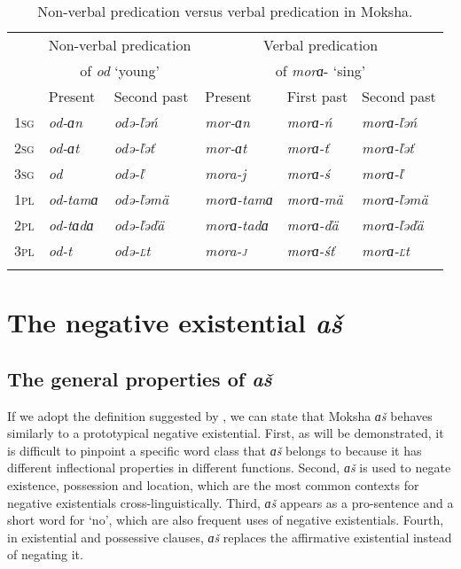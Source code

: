 \documentclass[output=paper,colorlinks,citecolor=brown,draft,draftmode]{langscibook}
\begin{document}
\begin{table}
\small
\newlength{\colnonverb}
\newlength{\colverb}
\newlength{\colfirst}
\newlength{\colsecond}
\caption{Non-verbal predication versus verbal predication in Moksha.}
\label{tab:2:4}
\begin{tabular}{ *6{l} }
\lsptoprule
         & \multicolumn{2}{c}{Non-verbal predication} & \multicolumn{3}{c}{Verbal predication}\\
         & \multicolumn{2}{c}{of \textit{od} `young'} & \multicolumn{3}{c}{of \textit{morɑ}- `sing'}\\
          \cmidrule(lr){2-3}\cmidrule(lr){4-6}
          &{Present} 	&{Second past} 	&{Present}	&{First past}	&{Second past}\\
\midrule
\textsc{{1sg}}	&\textit{od-ɑn} 	&\textit{odə-ľəń}	&\textit{mor-ɑn}	&\textit{morɑ-ń}		&\textit{morɑ-ľəń}\\
\textsc{{2sg}}	&\textit{od-ɑt}		&\textit{odə-ľəť}	&\textit{mor-ɑt}	&\textit{morɑ-ť}		&\textit{morɑ-ľəť}\\
\textsc{{3sg}}	&\textit{od}		&\textit{odə-ľ}		&\textit{mora-j}	&\textit{morɑ-ś}		&\textit{morɑ-ľ}\\
\textsc{{1pl}}	&\textit{od-tamɑ}	&\textit{odə-ľəmä}	&\textit{morɑ-tamɑ}	&\textit{morɑ-mä}		&\textit{morɑ-ľəmä}\\
\textsc{{2pl}} 	&\textit{od-tɑdɑ}	&\textit{odə-ľəďä}	&\textit{morɑ-tadɑ}	&\textit{morɑ-ďä}		&\textit{morɑ-ľəďä}\\
\textsc{{3pl}}	&\textit{od-t}		&\textit{odə-\textsc{ľ}t}&\textit{mora-\textsc{j}}&\textit{morɑ-śť}		&\textit{morɑ-\textsc{ľ}t}\\
\lspbottomrule
\end{tabular}
\end{table}

\section{The negative existential \textit{aš}}\label{sec:2:5}

\subsection{The general properties of \textit{aš}}\label{sec:2:5.1}

If we adopt the definition suggested by \citet[118--139]{Veselinova2013}, we can state that Moksha \textit{ɑš} behaves similarly to a prototypical negative existential. First, as will be demonstrated, it is difficult to pinpoint a specific word class that \textit{ɑš} belongs to because it has different inflectional properties in different functions. Second, \textit{ɑš} is used to negate existence, possession and location, which are the most common contexts for negative existentials cross-linguistically. Third, \textit{ɑš} appears as a pro-sentence and a short word for `no', which are also frequent uses of negative existentials. Fourth, in existential and possessive clauses, \textit{ɑš} replaces the affirmative existential instead of negating it.
\end{document}
